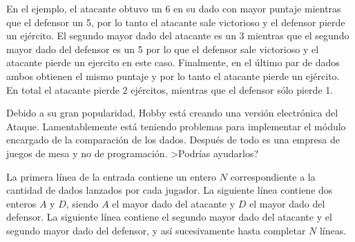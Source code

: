 \documentclass{oci}
\newcommand{\gana}{} %
\newcommand{\pierde}{$\times$}
\begin{document}
\begin{problemDescription}
\begin{center}
  \end{center}
 
  En el ejemplo, el atacante obtuvo un 6 en su dado con mayor puntaje
  mientras que el defensor un 5, por lo tanto el atacante sale victorioso y el
  defensor pierde un ejército.
  El segundo mayor dado del atacante es un 3 mientras que el segundo mayor dado del defensor
  es un 5 por lo que el
  defensor sale victorioso y el atacante pierde un ejercito en este caso.
  Finalmente, en el último par de dados ambos obtienen el mismo puntaje y por lo tanto
  el atacante pierde un ejército.
  En total el atacante pierde 2 ejércitos, mientras que el defensor sólo
  pierde 1.

  Debido a su gran popularidad, Hobby está creando una versión electrónica
  del Ataque.
  Lamentablemente está teniendo problemas para implementar el módulo encargado
  de la comparación de los dados.
  Después de todo es una empresa de juegos de mesa y no de programación.
  >Podrías ayudarlos?
\newpage
\end{problemDescription}

\begin{inputDescription}
  La primera línea de la entrada contiene un entero $N$ correspondiente a la cantidad de
  dados lanzados por cada jugador.
  La siguiente línea contiene dos enteros $A$ y $D$,
  siendo $A$ el mayor dado del atacante y $D$ el mayor dado del defensor.
  La siguiente línea contiene el segundo mayor dado del atacante y el segundo mayor
  dado del defensor, y así sucesivamente hasta completar $N$ líneas.  
\end{inputDescription}
\end{document}
